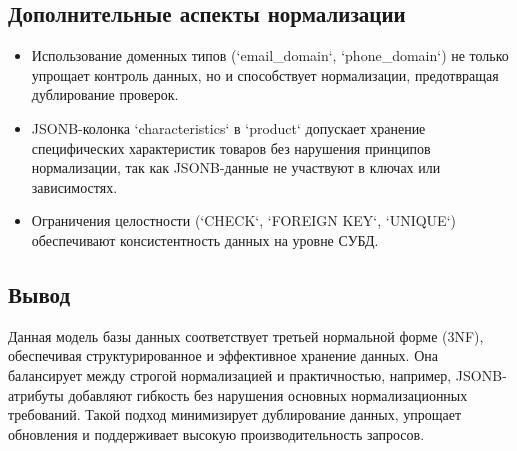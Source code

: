 \subsection{Дополнительные аспекты нормализации}\label{subsec:normalizationadditional}
\begin{itemize}
    \item Использование доменных типов (`email\_domain`, `phone\_domain`)
    не только упрощает контроль данных, но и способствует нормализации, предотвращая дублирование проверок.
    \item JSONB-колонка `characteristics` в `product` допускает хранение специфических
    характеристик товаров без нарушения принципов нормализации, так как JSONB-данные не
    участвуют в ключах или зависимостях.
    \item Ограничения целостности (`CHECK`, `FOREIGN KEY`, `UNIQUE`) обеспечивают
    консистентность данных на уровне СУБД.
\end{itemize}

\subsection{Вывод}\label{subsec:normalizationresult}
Данная модель базы данных соответствует третьей нормальной форме (3NF),
обеспечивая структурированное и эффективное хранение данных.
Она балансирует между строгой нормализацией и практичностью, например,
JSONB-атрибуты добавляют гибкость без нарушения основных нормализационных требований.
Такой подход минимизирует дублирование данных, упрощает обновления и поддерживает
высокую производительность запросов.

